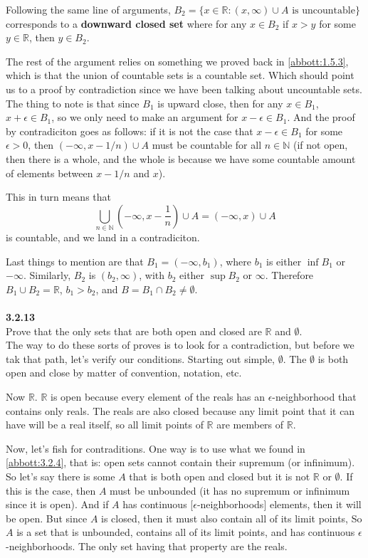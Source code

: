 Following the same line of arguments, $B_2 = \{ x\in\mathbb{R} : (x,\infty) \cup A \text{ is uncountable} \}$
corresponds to a \textbf{downward closed set} where for any $x\in B_2$ if $x > y$ for some $y\in\mathbb{R}$, then
$y \in B_2$.

The rest of the argument relies on something we proved back in \ref{abbott:1.5.3}, which is that the union
of countable sets is a countable set.
Which should point us to a proof by contradiction since we have been talking about uncountable sets.
The thing to note is that since $B_1$ is upward close, then for any $x\in B_1$, $x+\epsilon \in B_1$,
so we only need to make an argument for $x-\epsilon \in B_1$.
And the proof by contradiciton goes as follows: if it is not the case that $x-\epsilon \in B_1$ for some $\epsilon > 0$,
then $(-\infty, x-1/n) \cup A$ must be countable for all $n\in\mathbb{N}$
(if not open, then there is a whole, and the whole is because we have some countable amount of elements between $x-1/n$ and $x$).

This in turn means that
$$
\bigcup_{n\in\mathbb{N}} \left(-\infty,x-\frac{1}{n}\right) \cup A = (-\infty,x) \cup A
$$
is countable, and we land in a contradiciton.

Last things to mention are that $B_1 = (-\infty, b_1)$, where $b_1$ is either $\inf B_1$ or $-\infty$.
Similarly, $B_2$ is $(b_2, \infty)$, with $b_2$ either $\sup B_2$ or $\infty$.
Therefore $B_1 \cup B_2 = \mathbb{R}$, $b_1 > b_2$, and $B = B_1 \cap B_2 \neq \emptyset$.
\\~\\




\textbf{3.2.13}
\\

Prove that the only sets that are both open and closed are $\mathbb{R}$ and $\emptyset$.
\\

The way to do these sorts of proves is to look for a contradiction, but before we tak that path,
let's verify our conditions.
Starting out simple, $\emptyset$. The $\emptyset$ is both open and close by matter of convention, notation,
etc.

Now $\mathbb{R}$. $\mathbb{R}$ is open because every element of the reals has an $\epsilon$-neighborhood
that contains only reals.
The reals are also closed because any limit point that it can have will be a real itself, so
all limit points of $\mathbb{R}$ are members of $\mathbb{R}$.

Now, let's fish for contraditions.
One way is to use what we found in \ref{abbott:3.2.4}, that is: open sets cannot contain their supremum (or infinimum).
So let's say there is some $A$ that is both open and closed but it is not $\mathbb{R}$ or $\emptyset$.
If this is the case, then $A$ must be unbounded (it has no supremum or infinimum since it is open).
And if $A$ has continuous [$\epsilon$-neighborhoods] elements, then it will be open.
But since $A$ is closed, then it must also contain all of its limit points,
So $A$ is a set that is unbounded, contains all of its limit points, and has continuous $\epsilon$-neighborhoods.
The only set having that property are the reals.

